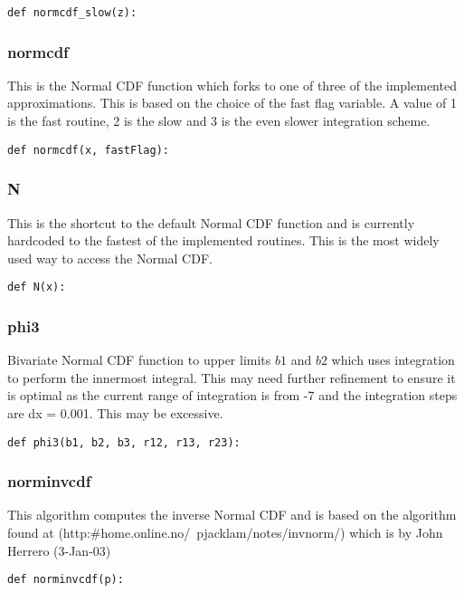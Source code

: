 \documentclass[twoside,11pt]{book}
\begin{document}
\begin{lstlisting}
def normcdf_slow(z):
\end{lstlisting}

\subsubsection*{{\bf normcdf}}
This is the Normal CDF function which forks to one of three of the implemented approximations. This is based on the choice of the fast flag variable. A value of 1 is the fast routine, 2 is the slow and 3 is the even slower integration scheme.  

\begin{lstlisting}
def normcdf(x, fastFlag):
\end{lstlisting}

\subsubsection*{{\bf N}}
This is the shortcut to the default Normal CDF function and is currently hardcoded to the fastest of the implemented routines. This is the most widely used way to access the Normal CDF.  

\begin{lstlisting}
def N(x):
\end{lstlisting}

\subsubsection*{{\bf phi3}}
Bivariate Normal CDF function to upper limits $b1$ and $b2$ which uses integration to perform the innermost integral. This may need further refinement to ensure it is optimal as the current range of integration is from -7 and the integration steps are dx = 0.001. This may be excessive.  

\begin{lstlisting}
def phi3(b1, b2, b3, r12, r13, r23):
\end{lstlisting}

\subsubsection*{{\bf norminvcdf}}
This algorithm computes the inverse Normal CDF and is based on the algorithm found at (http:\#home.online.no/~pjacklam/notes/invnorm/) which is by John Herrero (3-Jan-03)  

\begin{lstlisting}
def norminvcdf(p):
\end{lstlisting}
\end{document}

